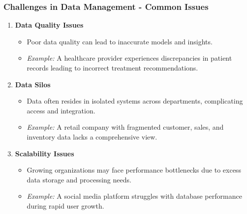 \documentclass[aspectratio=169]{beamer}
\begin{document}
\begin{frame}[fragile]
    \frametitle{Challenges in Data Management - Common Issues}
    \begin{enumerate}
        \item \textbf{Data Quality Issues}
        \begin{itemize}
            \item Poor data quality can lead to inaccurate models and insights.
            \item \textit{Example:} A healthcare provider experiences discrepancies in patient records leading to incorrect treatment recommendations.
        \end{itemize}

        \item \textbf{Data Silos}
        \begin{itemize}
            \item Data often resides in isolated systems across departments, complicating access and integration.
            \item \textit{Example:} A retail company with fragmented customer, sales, and inventory data lacks a comprehensive view.
        \end{itemize}

        \item \textbf{Scalability Issues}
        \begin{itemize}
            \item Growing organizations may face performance bottlenecks due to excess data storage and processing needs.
            \item \textit{Example:} A social media platform struggles with database performance during rapid user growth.
        \end{itemize}
    \end{enumerate}
\end{frame}
\end{document}
